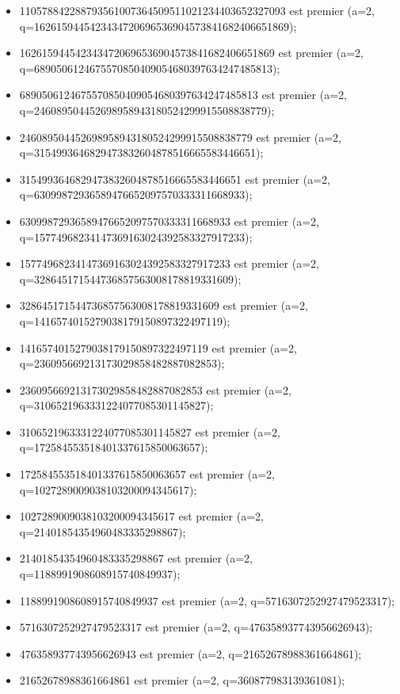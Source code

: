 \documentclass{article}
\begin{document}
\begin{itemize}
\item 110578842288793561007364509511021234403652327093 est premier (a=2,\\ q=1626159445423434720696536904573841682406651869);
\item 1626159445423434720696536904573841682406651869 est premier (a=2,\\ q=6890506124675570850409054680397634247485813);
\item 6890506124675570850409054680397634247485813 est premier (a=2,\\ q=246089504452698958943180524299915508838779);
\item 246089504452698958943180524299915508838779 est premier (a=2,\\ q=3154993646829473832604878516665583446651);
\item 3154993646829473832604878516665583446651 est premier (a=2, q=63099872936589476652097570333311668933);
\item 63099872936589476652097570333311668933 est premier (a=2, q=15774968234147369163024392583327917233);
\item 15774968234147369163024392583327917233 est premier (a=2, q=328645171544736857563008178819331609);
\item 328645171544736857563008178819331609 est premier (a=2, q=1416574015279038179150897322497119);
\item 1416574015279038179150897322497119 est premier (a=2, q=236095669213173029858482887082853);
\item 236095669213173029858482887082853 est premier (a=2, q=3106521963331224077085301145827);
\item 3106521963331224077085301145827 est premier (a=2, q=172584553518401337615850063657);
\item 172584553518401337615850063657 est premier (a=2, q=1027289009038103200094345617);
\item 1027289009038103200094345617 est premier (a=2, q=21401854354960483335298867);
\item 21401854354960483335298867 est premier (a=2, q=1188991908608915740849937);
\item 1188991908608915740849937 est premier (a=2, q=5716307252927479523317);
\item 5716307252927479523317 est premier (a=2, q=476358937743956626943);
\item 476358937743956626943 est premier (a=2, q=21652678988361664861);
\item 21652678988361664861 est premier (a=2, q=360877983139361081);

\end{itemize}
\end{document}
